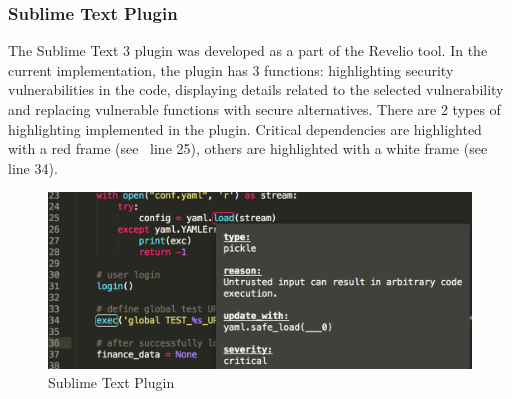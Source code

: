\subsubsection{Sublime Text Plugin}

The Sublime Text 3 plugin was developed as a part of the Revelio tool. In the current implementation, the plugin has 3 functions: highlighting security vulnerabilities in the code, displaying details related to the selected vulnerability and replacing vulnerable functions with secure alternatives. There are 2 types of highlighting implemented in the plugin. Critical dependencies are highlighted with a red frame (see~ line 25), others are highlighted with a white frame (see~ line 34).
\begin{figure}[h]
\centering
\includegraphics[width=\linewidth]{"figures/sublime"}
\caption{Sublime Text Plugin}
\label{fig:sublime}
\end{figure}

